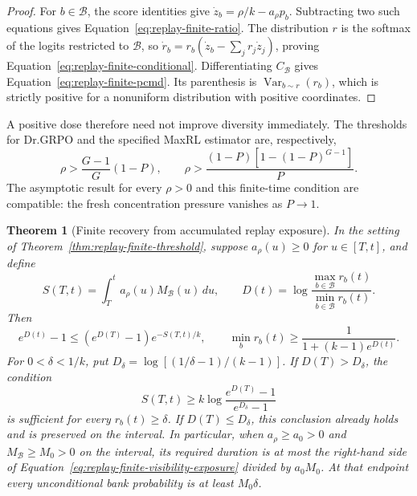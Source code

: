 \documentclass{article}
\newcommand{\enforcehalffinalproseline}{%
  \setlength{\parfillskip}{0pt plus .20\linewidth}}
\newcommand{\1}{\mathbf 1}
\newtheorem{theorem}[lemma]{Theorem}
\theoremstyle{remark}
\theoremstyle{definition}
\theoremstyle{plain}
\begin{document}
\begin{proof}
\enforcehalffinalproseline
For $b\in\mathcal B$, the score identities give
$\dot z_b=\rho/k-a_\rho p_b$. Subtracting two such equations gives
Equation~\eqref{eq:replay-finite-ratio}. The distribution $r$ is the softmax
of the logits restricted to $\mathcal B$, so
$\dot r_b=r_b(\dot z_b-\sum_jr_j\dot z_j)$, proving
Equation~\eqref{eq:replay-finite-conditional}. Differentiating
$C_{\mathcal B}$ gives Equation~\eqref{eq:replay-finite-pcmd}.
Its parenthesis is $\operatorname{Var}_{b\sim r}(r_b)$, which is strictly
positive for a nonuniform distribution with positive coordinates.
\end{proof}

A positive dose therefore need not improve diversity immediately.
The thresholds for Dr.GRPO and the specified MaxRL estimator are, respectively,
\[
 \rho>\frac{G-1}{G}(1-P),\qquad
 \rho>\frac{(1-P)[1-(1-P)^{G-1}]}{P}.
\]
The asymptotic result for every $\rho>0$ and this finite-time condition are
compatible: the fresh concentration pressure vanishes as $P\to1$.

\begin{theorem}[Finite recovery from accumulated replay exposure]
\enforcehalffinalproseline
\label{thm:replay-finite-recovery}
In the setting of Theorem~\ref{thm:replay-finite-threshold}, suppose
$a_\rho(u)\ge0$ for $u\in[T,t]$, and define
\[
 S(T,t)=\int_T^t a_\rho(u)M_{\mathcal B}(u)\,du,
 \qquad D(t)=\log\frac{\max_{b\in\mathcal B}r_b(t)}
                            {\min_{b\in\mathcal B}r_b(t)}.
\]
Then
\begin{equation}
 e^{D(t)}-1\le(e^{D(T)}-1)e^{-S(T,t)/k},
 \qquad
 \min_b r_b(t)\ge\frac{1}{1+(k-1)e^{D(t)}}.
 \label{eq:replay-finite-recovery}
\end{equation}
For $0<\delta<1/k$, put
$D_\delta=\log[(1/\delta-1)/(k-1)]$. If $D(T)>D_\delta$, the condition
\begin{equation}
 S(T,t)\ge k\log\frac{e^{D(T)}-1}{e^{D_\delta}-1}
 \label{eq:replay-finite-visibility-exposure}
\end{equation}
is sufficient for every $r_b(t)\ge\delta$. If $D(T)\le D_\delta$, this
conclusion already holds and is preserved on the interval. In particular,
when $a_\rho\ge a_0>0$ and $M_{\mathcal B}\ge M_0>0$ on the interval,
its required duration is at most the right-hand side of
Equation~\eqref{eq:replay-finite-visibility-exposure} divided by $a_0M_0$.
At that endpoint every unconditional bank probability is at least
$M_0\delta$.
\end{theorem}
\end{document}
